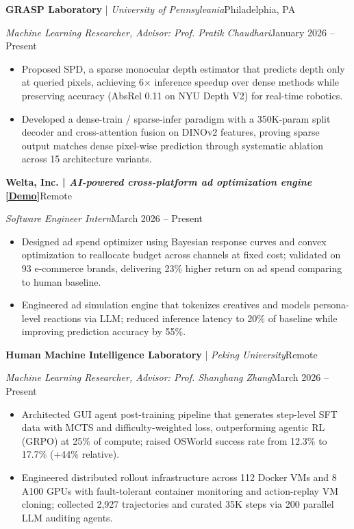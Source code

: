 \documentclass[10pt,letterpaper]{article}
\newcommand{\resheading}[4]{%
    \textbf{#1}\hfill #2\par
    \textit{#3}\hfill #4\par
}
\begin{document}
\textbf{GRASP Laboratory} \;|\; \textit{University of Pennsylvania}\hfill Philadelphia, PA \par
\textit{Machine Learning Researcher, Advisor: Prof. Pratik Chaudhari}\hfill January 2026 -- Present
\begin{itemize}
    \item Proposed SPD, a sparse monocular depth estimator that predicts depth only at queried pixels, achieving 6$\times$ inference speedup over dense methods while preserving accuracy (AbsRel 0.11 on NYU Depth V2) for real-time robotics.
    \item Developed a dense-train / sparse-infer paradigm with a 350K-param split decoder and cross-attention fusion on DINOv2 features, proving sparse output matches dense pixel-wise prediction through systematic ablation across 15 architecture variants.
\end{itemize}
\vspace{1pt}
\resheading{Welta, Inc. \;|\; \normalfont\textit{AI-powered cross-platform ad optimization engine} \textbf{\href{https://app.welta.ai}{[Demo]}}}{Remote}{Software Engineer Intern}{March 2026 -- Present}
\begin{itemize}
    \item Designed ad spend optimizer using Bayesian response curves and convex optimization to reallocate budget across channels at fixed cost; validated on 93 e-commerce brands, delivering 23\% higher return on ad spend comparing to human baseline.
    \item Engineered ad simulation engine that tokenizes creatives and models persona-level reactions via LLM; reduced inference latency to 20\% of baseline while improving prediction accuracy by 55\%.
\end{itemize}
\vspace{1pt}
\textbf{Human Machine Intelligence Laboratory} \;|\; \textit{Peking University}\hfill Remote \par
\textit{Machine Learning Researcher, Advisor: Prof. Shanghang Zhang}\hfill March 2026 -- Present
\begin{itemize}
    \item Architected GUI agent post-training pipeline that generates step-level SFT data with MCTS and difficulty-weighted loss, outperforming agentic RL (GRPO) at 25\% of compute; raised OSWorld success rate from 12.3\% to 17.7\% (+44\% relative).
    \item Engineered distributed rollout infrastructure across 112 Docker VMs and 8 A100 GPUs with fault-tolerant container monitoring and action-replay VM cloning; collected 2,927 trajectories and curated 35K steps via 200 parallel LLM auditing agents.
\end{itemize}
\end{document}
